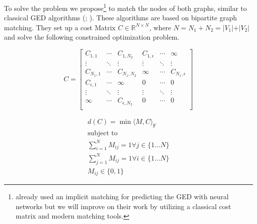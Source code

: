 To solve the problem we propose\footnote{\cite{riba2018} already used an implicit matching for predicting the GED with neural networks but we will improve on their work by utilizing a classical cost matrix and modern matching tools.} to match the nodes of both graphs, similar to classical GED algorithms (\citealp{hungarian2009}; \citealp{frankhauser2011}). These algorithms are based on bipartite graph matching. They set up a cost Matrix $C \in \mathbb{R}^{N \times N}$, where $N = N_1 + N_2 = \vert V_1 \vert + \vert V_2 \vert $ and solve the following constrained optimization problem.

\vspace{.2cm}

\noindent
\begin{minipage}{.5\linewidth}

     \[
          C=
               \left[
               \begin{array}{ccc|ccc}
                    C_{1,1} & \dotsi & C_{1, N_2} & C_{1, \epsilon} & \dotsi & \infty \\
                    \vdots & \ddots & \vdots & \vdots & \ddots & \vdots \\
                    C_{N_1, 1} & \dotsi & C_{N_1, N_2} & \infty & \dotsi & C_{N_1, \epsilon} \\
                    \hline
                    C_{\epsilon, 1} & \dotsi & \infty & 0 & \dotsi & 0 \\
                    \vdots & \ddots & \vdots & \vdots & \ddots & \vdots \\
                    \infty & \dotsi & C_{\epsilon, N_2} & 0 & \dotsi & 0 \\
               \end{array}
               \right]
     \]

\end{minipage}%
\begin{minipage}{.5\linewidth}

     \begin{equation}
          \begin{gathered}
               d(C) = \min \langle M, C \rangle_\mathrm{F} \\
               \text{subject to} \\
               \sum_{i = 1}^{N} M_{ij} = 1 \forall j \in \{1 \dots N\} \\
               \sum_{j = 1}^{N} M_{ij} = 1 \forall i \in \{1 \dots N\} \\
               M_{ij} \in \{0, 1\}
          \end{gathered}
     \end{equation}

\end{minipage}


